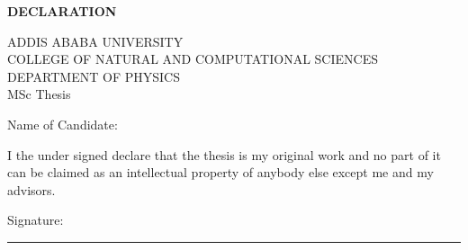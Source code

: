\begin{center}
\textbf{DECLARATION}
\end{center}

\begin{center}
{ ADDIS ABABA UNIVERSITY\\
COLLEGE OF NATURAL AND COMPUTATIONAL SCIENCES\\
DEPARTMENT OF PHYSICS \\[2cm]
MSc Thesis
}

{\centering
\thesistitle
}

\end{center}

\vspace{1cm}
Name of Candidate: \candidate
\vspace{1cm}

I the under signed declare that the thesis  is my original work and no part of it can be claimed as an intellectual property of anybody else except me and my advisors.

\vspace{1cm}

\begin{flushright}
Signature: \rule{5cm}{1pt}
\end{flushright}

\vskip 4cm
